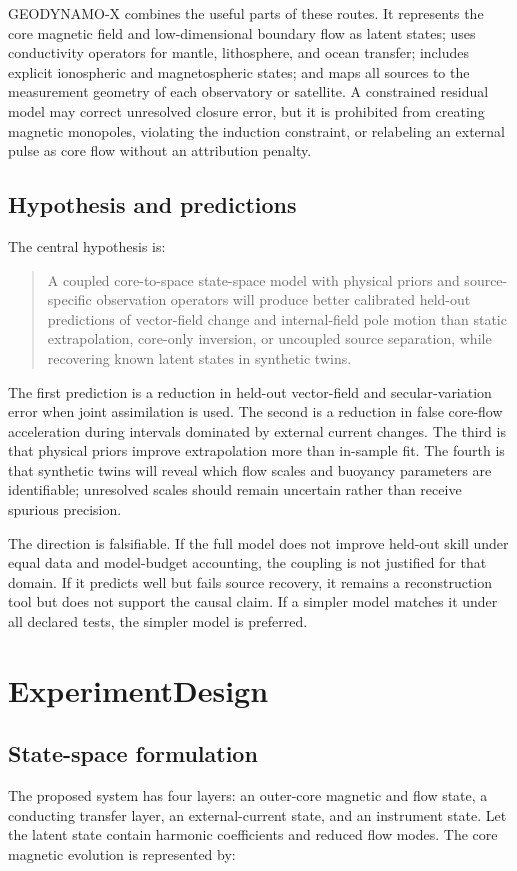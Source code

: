 \documentclass[conference]{IEEEtran}
\begin{document}
GEODYNAMO-X combines the useful parts of these routes. It represents the core magnetic field and low-dimensional boundary flow as latent states; uses conductivity operators for mantle, lithosphere, and ocean transfer; includes explicit ionospheric and magnetospheric states; and maps all sources to the measurement geometry of each observatory or satellite. A constrained residual model may correct unresolved closure error, but it is prohibited from creating magnetic monopoles, violating the induction constraint, or relabeling an external pulse as core flow without an attribution penalty.

\subsection{Hypothesis and predictions}
The central hypothesis is:

\begin{quote}
A coupled core-to-space state-space model with physical priors and source-specific observation operators will produce better calibrated held-out predictions of vector-field change and internal-field pole motion than static extrapolation, core-only inversion, or uncoupled source separation, while recovering known latent states in synthetic twins.
\end{quote}

The first prediction is a reduction in held-out vector-field and secular-variation error when joint assimilation is used. The second is a reduction in false core-flow acceleration during intervals dominated by external current changes. The third is that physical priors improve extrapolation more than in-sample fit. The fourth is that synthetic twins will reveal which flow scales and buoyancy parameters are identifiable; unresolved scales should remain uncertain rather than receive spurious precision.

The direction is falsifiable. If the full model does not improve held-out skill under equal data and model-budget accounting, the coupling is not justified for that domain. If it predicts well but fails source recovery, it remains a reconstruction tool but does not support the causal claim. If a simpler model matches it under all declared tests, the simpler model is preferred.

\section{ExperimentDesign}
\subsection{State-space formulation}
The proposed system has four layers: an outer-core magnetic and flow state, a conducting transfer layer, an external-current state, and an instrument state. Let the latent state contain harmonic coefficients and reduced flow modes. The core magnetic evolution is represented by:
\end{document}
